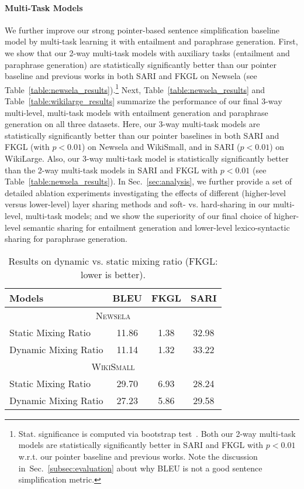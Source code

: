 \documentclass[11pt]{article}
\def\secref#1{Sec.~\ref{#1}}
\begin{document}
\paragraph{Multi-Task Models}
We further improve our strong pointer-based sentence simplification baseline model by multi-task learning it with entailment and paraphrase generation. First, we show that our 2-way multi-task models with auxiliary tasks (entailment and paraphrase generation) are statistically significantly better than our pointer baseline and previous works in both SARI and FKGL on Newsela (see Table~\ref{table:newsela_results}).\footnote{Stat. significance is computed via bootstrap test~\cite{noreen1989computer,efron1994introduction}. Both our 2-way multi-task models are statistically significantly better in SARI and FKGL with $p<0.01$ w.r.t. our pointer baseline and previous works. Note the discussion in~\secref{subsec:evaluation} about why BLEU is not a good sentence simplification metric.} 
Next, Table~\ref{table:newsela_results} and Table~\ref{table:wikilarge_results} summarize the performance of our final 3-way multi-level, multi-task models with entailment generation and paraphrase generation on all three datasets.
Here, our 3-way multi-task models are statistically significantly better than our pointer baselines in both SARI and FKGL (with $p<0.01$) on Newsela and WikiSmall, and in SARI ($p<0.01$) on WikiLarge.
Also, our 3-way multi-task model is statistically significantly better than the 2-way multi-task models in SARI and FKGL with $p<0.01$ (see Table~\ref{table:newsela_results}). In Sec.~\ref{sec:analysis}, we further provide a set of detailed ablation experiments investigating the effects of different (higher-level versus lower-level) layer sharing methods and soft- vs. hard-sharing in our multi-level, multi-task models; and we show the superiority of our final choice of higher-level semantic sharing for entailment generation and lower-level lexico-syntactic sharing for paraphrase generation.


\begin{wraptable}[8]{r}{0.45\textwidth}
\begin{small}
\begin{center}
\vspace{-4pt}
\begin{tabular}{|l|c|c|c|}
\hline
Models & BLEU & FKGL & SARI \\
\hline
\multicolumn{4}{|c|}{\textsc{Newsela}}\\
\hline
Static Mixing Ratio  & 11.86 & 1.38 & 32.98 \\
Dynamic Mixing Ratio & 11.14 & 1.32  & 33.22 \\
\hline
\multicolumn{4}{|c|}{\textsc{WikiSmall}}\\
\hline
Static Mixing Ratio  & 29.70 &  6.93 & 28.24 \\
Dynamic Mixing Ratio & 27.23 &  5.86 & 29.58 \\
\hline
\end{tabular}
\end{center}
\vspace{-12pt}
\caption{Results on dynamic vs. static mixing ratio (FKGL: lower is better).}
\label{table:dynamic-mixing-results}
\end{small}
\end{wraptable}
\end{document}

